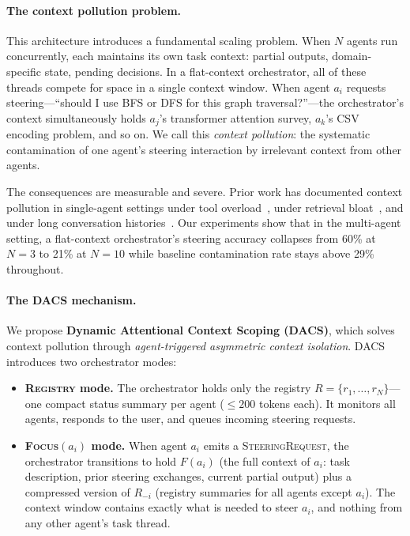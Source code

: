 \documentclass{article}
\begin{document}
\paragraph{The context pollution problem.}
This architecture introduces a fundamental scaling problem.
When $N$ agents run concurrently, each maintains its own task context:
partial outputs, domain-specific state, pending decisions.
In a flat-context orchestrator, all of these threads compete for space in
a single context window.
When agent $a_i$ requests steering—``should I use BFS or DFS for this
graph traversal?''—the orchestrator's context simultaneously holds $a_j$'s
transformer attention survey, $a_k$'s CSV encoding problem, and so on.
We call this \emph{context pollution}: the systematic contamination of
one agent's steering interaction by irrelevant context from other agents.

The consequences are measurable and severe.
Prior work has documented context pollution in single-agent settings
under tool overload~\citep{adaptorch2025,codedelegator2025}, under
retrieval bloat~\citep{sidequest2025}, and under long conversation
histories~\citep{afm2024,ace2026}.
Our experiments show that in the multi-agent setting, a flat-context
orchestrator's steering accuracy collapses from 60\% at $N=3$ to 21\% at
$N=10$ while baseline contamination rate stays above 29\% throughout.

\paragraph{The DACS mechanism.}
We propose \textbf{Dynamic Attentional Context Scoping (DACS)}, which
solves context pollution through \emph{agent-triggered asymmetric context
isolation}.
DACS introduces two orchestrator modes:

\begin{itemize}
  \item \textbf{\textsc{Registry} mode.} The orchestrator holds only the
  registry $R = \{r_1, \ldots, r_N\}$—one compact status summary per
  agent ($\leq 200$ tokens each).
  It monitors all agents, responds to the user, and queues incoming
  steering requests.

  \item \textbf{\textsc{Focus}$(a_i)$ mode.} When agent $a_i$ emits a
  \textsc{SteeringRequest}, the orchestrator transitions to hold $F(a_i)$
  (the full context of $a_i$: task description, prior steering exchanges,
  current partial output) plus a compressed version of $R_{-i}$
  (registry summaries for all agents except $a_i$).
  The context window contains exactly what is needed to steer $a_i$,
  and nothing from any other agent's task thread.
\end{itemize}
\end{document}

